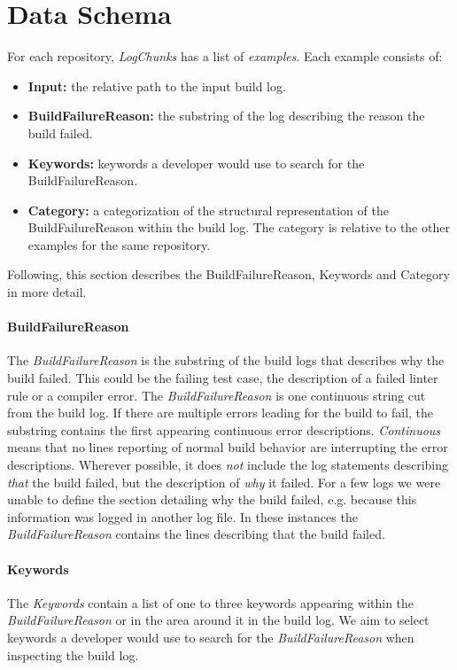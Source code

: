 \documentclass[\myrootdir/main.tex]{subfiles}
\begin{document}
\section{Data Schema}
\label{sec:data-schema}
For each repository, \emph{LogChunks} has a list of \emph{examples}.
Each example consists of:
\begin{itemize}
	\item \textbf{Input:} the relative path to the input build log.
	\item \textbf{BuildFailureReason:} the substring of the log describing the reason the build failed.
	\item \textbf{Keywords:} keywords a developer would use to search for the BuildFailureReason.
	\item \textbf{Category:} a categorization of the structural representation of the BuildFailureReason within the build log.
				The category is relative to the other examples for the same repository.
\end{itemize}
Following, this section describes the BuildFailureReason, Keywords and Category in more detail.

\paragraph{BuildFailureReason}
The \emph{BuildFailureReason} is the substring of the build logs that describes why the build failed.
This could be the failing test case, the description of a failed linter rule or a compiler error.
The \emph{BuildFailureReason} is one continuous string cut from the build log.
If there are multiple errors leading for the build to fail, the substring contains the first appearing continuous error descriptions.
\emph{Continuous} means that no lines reporting of normal build behavior are interrupting the error descriptions.
Wherever possible, it does \emph{not} include the log statements describing \emph{that} the build failed, but the description of \emph{why} it failed.
For a few logs we were unable to define the section detailing why the build failed, e.g. because this information was logged in another log file.
In these instances the \emph{BuildFailureReason} contains the lines describing that the build failed.

\paragraph{Keywords}
The \emph{Keywords} contain a list of one to three keywords appearing within the \emph{BuildFailureReason} or in the area around it in the build log.
We aim to select keywords a developer would use to search for the \emph{BuildFailureReason} when inspecting the build log.
\end{document}
